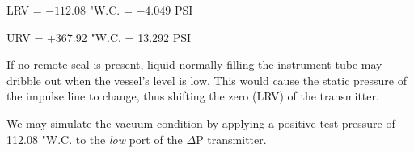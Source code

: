 \vskip 10pt

LRV = $-112.08$ "W.C. = $-4.049$ PSI

\vskip 10pt

URV = +367.92 "W.C. = 13.292 PSI

\vskip 10pt

If no remote seal is present, liquid normally filling the instrument tube may dribble out when the vessel's level is low.  This would cause the static pressure of the impulse line to change, thus shifting the zero (LRV) of the transmitter.

\vskip 10pt

We may simulate the vacuum condition by applying a positive test pressure of 112.08 "W.C. to the {\it low} port of the $\Delta$P transmitter.




